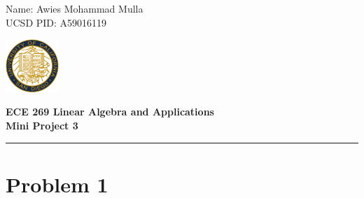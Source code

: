 \documentclass[11pt,letterpaper]{article}
\begin{document}
\pagestyle{plain}

\begin{flushleft}
Name: Awies Mohammad Mulla\\
UCSD PID: A59016119
\end{flushleft}

\begin{flushright}\vspace{-15mm}
\includegraphics[height=2cm]{logo.png}
\end{flushright}
 
\begin{center}\vspace{-1cm}
\textbf{\large ECE 269 Linear Algebra and Applications}\\
\textbf{\large Mini Project 3}\\
\end{center}

 
\rule{\linewidth}{0.1mm}

\section*{Problem 1}
\end{document}

